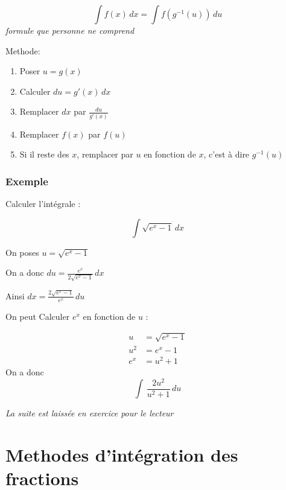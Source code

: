 \documentclass{article}
\begin{document}
\begin{center}
\begin{equation}
    \int f(x) \, dx = \int f(g^{-1}(u)) \, du
\end{equation}
\textit{formule que personne ne comprend}
\end{center}

Methode:

\begin{enumerate}
    \item Poser $u = g(x)$
    \item Calculer $du = g'(x) \, dx$
    \item Remplacer $dx$ par $\frac{du}{g'(x)}$
    \item Remplacer $f(x)$ par $f(u)$
    \item Si il reste des $x$, remplacer par $u$ en fonction de $x$, c'est à dire $g^{-1}(u)$
\end{enumerate}

\subsubsection*{Exemple}

Calculer l'intégrale :

\begin{equation*}
    \int \sqrt{e^x-1} \, dx
\end{equation*}

On poses $u = \sqrt{e^x-1}$

On a donc $du = \frac{e^x}{2 \sqrt{e^x-1}} \, dx$

Ainsi $dx = \frac{2 \sqrt{e^x-1}}{e^x} \, du$

On peut Calculer $e^x$ en fonction de $u$ :

\begin{align*}
    u &= \sqrt{e^x-1} \\
    u^2 &= e^x - 1 \\
    e^x &= u^2 + 1
\end{align*}
On a donc
\begin{equation*}
    \int \, \frac{2 u^2}{u^2 + 1} \, du
\end{equation*}

\textit{La suite est laissée en exercice pour le lecteur}


\section*{Methodes d'intégration des fractions}
\end{document}
